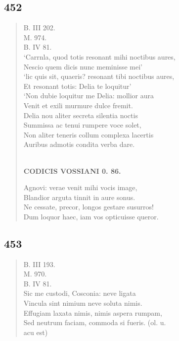 \documentclass[11pt, a4paper]{report}
\begin{document}
            \subsection*{452}
      \begin{verse}
      B. III 202. \\ M. 974. \\ B. IV 81. \\ ‘Carrnla, quod totis resonant mihi noctibus aures, \\ Nescio quem dicis nunc meminisse mei’ \\ ‘lic quis sit, quaeris? resonant tibi noctibus aures, \\ Et resonant totis: Delia te loquitur’ \\ ‘Non dubie loquitur me Delia: mollior aura \\ Venit et exili murmure dulce fremit. \\ Delia nou aliter secreta silentia noctis \\ Summissa ac tenui rumpere voce solet, \\ Non aliter teneris collum complexa lacertis \\ Auribus admotis condita verba dare. \\ 
        ﻿\pagebreak 
    \begin{center} \textbf{CODICIS VOSSIANI 0. 86.} \end{center} \marginpar{[337]} Agnovi: verae venit mihi vocis image, \\ Blandior arguta tinnit in aure sonus. \\ Ne cessate, precor, longos gestare susurros! \\ Dum loquor haec, iam vos opticuisse queror. \\ 
      \end{verse}
  
            \subsection*{453}
      \begin{verse}
      B. III 193. \\ M. 970. \\ B. IV 81. \\ Sic me custodi, Cosconia: neve ligata \\ Vincula sint nimium neve soluta nimis. \\ Effugiam laxata nimis, nimis aspera rumpam, \\ Sed neutrum faciam, commoda si fueris. (ol. u. \\ acu est) \\ 
      \end{verse}
  
\end{document}
